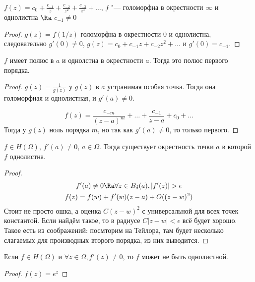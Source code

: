 \begin{conseq}
	$f(z) = c_0 + \frac{c_{-1}}{z} + \frac{c_{-2}}{z^2} + \frac{c_{-3}}{z^3} + \dots$, 
	$f$ "--- голоморфна в окрестности $\infty$ и однолистна 
	$\Ra$ 
	$c_{-1} \neq 0$
\end{conseq}

\begin{proof}
	$g(z) = f(1 / z)$ голоморфна в окрестности 0 и однолистна, следовательно $g'(0) \ne 0$, $g(z) = c_0 + c_{-1} z + c_{-2} z^2 + \dots$ и $g'(0) = c_{-1}$.
\end{proof}

\begin{conseq}
	$f$ имеет полюс в $a$ и однолстна в окрестности $a$.
	Тогда это полюс первого порядка.
\end{conseq}

\begin{proof}
	$g(z) = \frac1{g(z)}$ у $g(z)$ в $a$ устранимая особая точка.
	Тогда она голоморфная и однолистная, и $g'(a) \ne 0$.

	\[ f(z) = \frac{c_{-m}}{(z-a)^m} + \ldots + \frac{c_{-1}}{z - a} +  c_0 + \dots \]
	Тогда у $g(z)$ ноль порядка $m$, но так как $g'(a) \ne 0$, то только первого.
\end{proof}

\begin{Rem}
	$f \in H(\Omega)$, $f'(a) \ne 0$, $a \in \Omega$.
	Тогда существует окрестность точки $a$ в которой $f$ однолистна.
\end{Rem}

\begin{proof}
	\begin{gather*}
		f'(a) \ne 0 \Ra \forall z \in B_{\delta}(a), |f'(z)| > \epsilon \\
		f(z) = f(w) + f'(w) (z-a) + O((z-w)^2)
	\end{gather*}
	Стоит не просто ошка, а оценка $C(z-w)^2$ с универсальной для всех точек константой.
	Если найдём такое, то в радиусе $C|z-w| < \epsilon$ всё будет хорошо.
	Такое есть из соображений: посмторим на Тейлора, там будет несколько слагаемых для производных второго порядка, из них выводится.
\end{proof}

\begin{Rem}
	Если $f \in H(\Omega)$ и $\forall z \in \Omega, f'(z) \ne 0$, то $f$ может не быть однолистной.
\end{Rem}

\begin{proof}
	$f(z) = e^z$
\end{proof}

